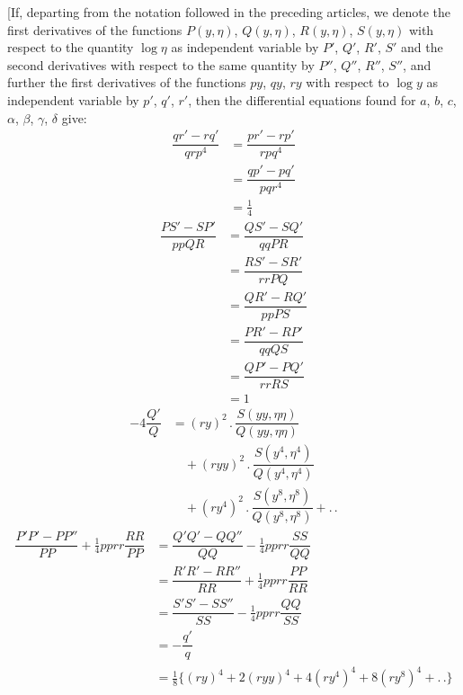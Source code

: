 [If, departing from the notation followed in the preceding articles, we denote the first derivatives of the functions $P(y,\allowbreak \eta)$, $Q(y,\allowbreak \eta)$, $R(y,\allowbreak \eta)$, $S(y,\allowbreak \eta)$ with respect to the quantity $\log\eta$ as independent variable by $P'$, $Q'$, $R'$, $S'$ and the second derivatives with respect to the same quantity by $P''$, $Q''$, $R''$, $S''$, and further the first derivatives of the functions $py$, $qy$, $ry$ with respect to $\log y$ as independent variable by $p'$, $q'$, $r'$, then the differential equations found for $a$, $b$, $c$, $\alpha$, $\beta$, $\gamma$, $\delta$ give:
\[
\begin{aligned}\dfrac{qr'-rq'}{qrp^4}&=\dfrac{pr'-rp'}{rpq^4}
 \\[7pt]&=\dfrac{qp'-pq'}{pqr^4}\\[7pt]&=\tfrac14\end{aligned}
\]
\[
\begin{aligned}\dfrac{PS'-SP'}{ppQR}&=\dfrac{QS'-SQ'}{qqPR}
 \\[7pt]&=\dfrac{RS'-SR'}{rrPQ}\\[7pt]&=\dfrac{QR'-RQ'}{ppPS}
 \\[7pt]&=\dfrac{PR'-RP'}{qqQS}\\[7pt]&=\dfrac{QP'-PQ'}{rrRS}\\[7pt]&=1\end{aligned}
\]
\[
\begin{aligned}-4\dfrac{Q'}Q&=(ry)^2\mathbin{.}\dfrac{S(yy,\eta\eta)}{Q(yy,\eta\eta)}\\[6pt]&\quad{}+
(ryy)^2\mathbin{.}\dfrac{S(y^4,\eta^4)}{Q(y^4,\eta^4)}\\[6pt]&\quad{}+
(ry^4)^2\mathbin{.}\dfrac{S(y^8,\eta^8)}{Q(y^8,\eta^8)}+\mathord{.}\,\mathord{.}\end{aligned}
\]
\[
\begin{aligned}
\dfrac{P'P'-PP''}{PP}+\tfrac14pprr\dfrac{RR}{PP}
 &=\dfrac{Q'Q'-QQ''}{QQ}-\tfrac14pprr\dfrac{SS}{QQ}
\\[8pt]&=\dfrac{R'R'-RR''}{RR}+\tfrac14pprr\dfrac{PP}{RR}
 \\[8pt]&=\dfrac{S'S'-SS''}{SS}-\tfrac14pprr\dfrac{QQ}{SS}
\\[8pt]&=-\dfrac{q'}q\\[8pt]&=\tfrac18\{(ry)^4+2(ryy)^4+4(ry^4)^4+8(ry^8)^4+\mathord{.}\,\mathord{.}\}
\end{aligned}
\]

